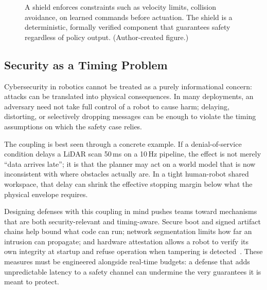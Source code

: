 \documentclass[smallextended]{svjour3}
\begin{document}
\begin{figure}[htbp]
  \centering
  \caption{A shield enforces constraints such as velocity limits, collision avoidance, on learned commands before actuation. The shield is a deterministic, formally verified component that guarantees safety regardless of policy output. (Author-created figure.)}
  \label{fig:shield}
\end{figure}

\subsection{Security as a Timing Problem}

Cybersecurity in robotics cannot be treated as a purely informational concern: attacks can be translated into physical consequences. In many deployments, an adversary need not take full control of a robot to cause harm; delaying, distorting, or selectively dropping messages can be enough to violate the timing assumptions on which the safety case relies.

The coupling is best seen through a concrete example. If a denial-of-service condition delays a LiDAR scan 50\,ms on a 10\,Hz  pipeline, the effect is not merely ``data arrives late''; it is that the planner may act on a world model that is now inconsistent with where obstacles actually are. In a tight human-robot shared workspace, that delay can shrink the effective stopping margin below what the physical envelope requires.

Designing defenses with this coupling in mind pushes teams toward mechanisms that are both security-relevant and timing-aware. Secure boot and signed artifact chains help bound what code can run; network segmentation limits how far an intrusion can propagate; and hardware attestation allows a robot to verify its own integrity at
startup and refuse operation when tampering is detected~\cite{pu2023securityrobots}. These measures must be engineered alongside real-time budgets: a defense that adds unpredictable latency to a safety channel can undermine the very guarantees it is meant to protect.
\end{document}
